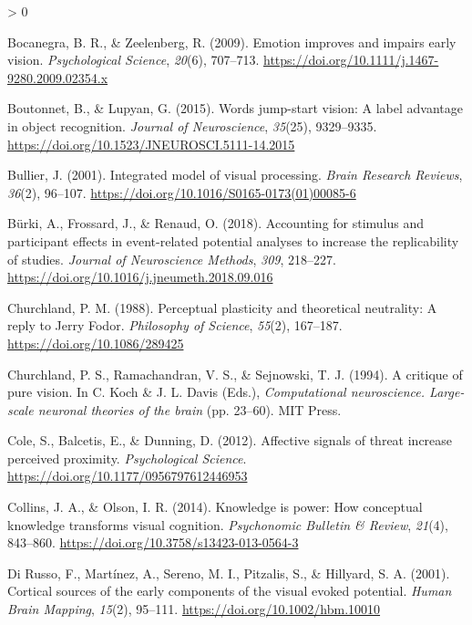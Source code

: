 \documentclass[
  english,
  man,12pt,twoside]{apa7}
\newlength{\cslhangindent}
\newenvironment{CSLReferences}[2] %
 {%
  \setlength{\parindent}{0pt}
  \ifodd #1 \everypar{\setlength{\hangindent}{\cslhangindent}}\ignorespaces\fi
  \ifnum #2 > 0
  \setlength{\parskip}{#2\baselineskip}
  \fi
 }%
 {}
\begin{document}
\begin{CSLReferences}{1}{0}
\leavevmode\hypertarget{ref-bocanegra2009}{}%
Bocanegra, B. R., \& Zeelenberg, R. (2009). Emotion improves and impairs early vision. \emph{Psychological Science}, \emph{20}(6), 707--713. \url{https://doi.org/10.1111/j.1467-9280.2009.02354.x}

\leavevmode\hypertarget{ref-boutonnet2015}{}%
Boutonnet, B., \& Lupyan, G. (2015). Words jump-start vision: A label advantage in object recognition. \emph{Journal of Neuroscience}, \emph{35}(25), 9329--9335. \url{https://doi.org/10.1523/JNEUROSCI.5111-14.2015}

\leavevmode\hypertarget{ref-bullier2001}{}%
Bullier, J. (2001). Integrated model of visual processing. \emph{Brain Research Reviews}, \emph{36}(2), 96--107. \url{https://doi.org/10.1016/S0165-0173(01)00085-6}

\leavevmode\hypertarget{ref-buxfcrki2018}{}%
Bürki, A., Frossard, J., \& Renaud, O. (2018). Accounting for stimulus and participant effects in event-related potential analyses to increase the replicability of studies. \emph{Journal of Neuroscience Methods}, \emph{309}, 218--227. \url{https://doi.org/10.1016/j.jneumeth.2018.09.016}

\leavevmode\hypertarget{ref-churchland1988}{}%
Churchland, P. M. (1988). Perceptual plasticity and theoretical neutrality: A reply to {Jerry} {Fodor}. \emph{Philosophy of Science}, \emph{55}(2), 167--187. \url{https://doi.org/10.1086/289425}

\leavevmode\hypertarget{ref-churchland1994}{}%
Churchland, P. S., Ramachandran, V. S., \& Sejnowski, T. J. (1994). A critique of pure vision. In C. Koch \& J. L. Davis (Eds.), \emph{Computational neuroscience. Large-scale neuronal theories of the brain} (pp. 23--60). MIT Press.

\leavevmode\hypertarget{ref-cole2012}{}%
Cole, S., Balcetis, E., \& Dunning, D. (2012). Affective signals of threat increase perceived proximity. \emph{Psychological Science}. \url{https://doi.org/10.1177/0956797612446953}

\leavevmode\hypertarget{ref-collins2014}{}%
Collins, J. A., \& Olson, I. R. (2014). Knowledge is power: How conceptual knowledge transforms visual cognition. \emph{Psychonomic Bulletin \& Review}, \emph{21}(4), 843--860. \url{https://doi.org/10.3758/s13423-013-0564-3}

\leavevmode\hypertarget{ref-dirusso2001}{}%
Di Russo, F., Martínez, A., Sereno, M. I., Pitzalis, S., \& Hillyard, S. A. (2001). Cortical sources of the early components of the visual evoked potential. \emph{Human Brain Mapping}, \emph{15}(2), 95--111. \url{https://doi.org/10.1002/hbm.10010}


\end{CSLReferences}
\end{document}

